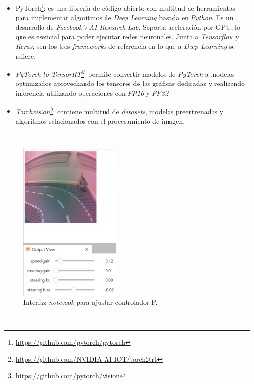 \begin{itemize}
	\item PyTorch\footnote{\url{https://github.com/pytorch/pytorch}}: es una librería de código abierto con multitud de herramientas para implementar algoritmos de \textit{Deep Learning} basada en \textit{Python}\cite{autopilottesla}. Es un desarrollo de \textit{Facebook's AI Research Lab}. Soporta aceleración por GPU, lo que es esencial para poder ejecutar redes neuronales. Junto a \textit{Tensorflow} y \textit{Keras}, son los tres \textit{frameworks} de referencia en lo que a \textit{Deep Learning} se refiere.
	\item \textit{PyTorch to TensorRT\footnote{\url{https://github.com/NVIDIA-AI-IOT/torch2trt}}}: permite convertir modelos de \textit{PyTorch} a modelos optimizados aprovechando los tensores de las gráficas dedicadas y realizando inferencia utilizando operaciones con \textit{FP16} y \textit{FP32}.
	\item \textit{Torchvision\footnote{\url{https://github.com/pytorch/vision}}}: contiene multitud de \textit{datasets}, modelos preentrenados y algoritmos relacionados con el procesamiento de imagen.
\end{itemize}\

\begin{figure} [h!]
	\begin{center}
		\includegraphics[width=5cm]{figs/livejetracer}
	\end{center}
	\caption{Interfaz \textit{notebook} para ajustar controlador P.}
	\label{fig:livejetracer}
\end{figure}\

